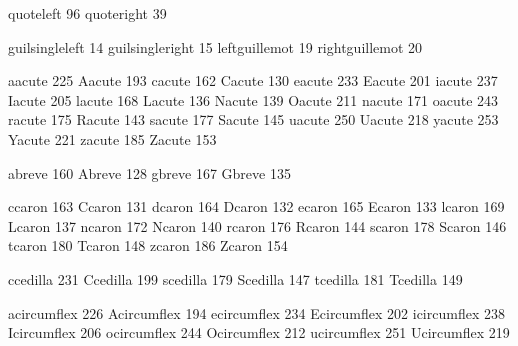  quoteleft        96
 quoteright       39

 guilsingleleft   14
 guilsingleright  15
 leftguillemot    19
 rightguillemot   20

 aacute          225
 Aacute          193
 cacute          162
 Cacute          130
 eacute          233
 Eacute          201
 iacute          237
 Iacute          205
 lacute          168
 Lacute          136
 Nacute          139
 Oacute          211
 nacute          171
 oacute          243
 racute          175
 Racute          143
 sacute          177
 Sacute          145
 uacute          250
 Uacute          218
 yacute          253
 Yacute          221
 zacute          185
 Zacute          153

 abreve          160
 Abreve          128
 gbreve          167
 Gbreve          135

 ccaron          163
 Ccaron          131
 dcaron          164
 Dcaron          132
 ecaron          165
 Ecaron          133
 lcaron          169
 Lcaron          137
 ncaron          172
 Ncaron          140
 rcaron          176
 Rcaron          144
 scaron          178
 Scaron          146
 tcaron          180
 Tcaron          148
 zcaron          186
 Zcaron          154

 ccedilla        231
 Ccedilla        199
 scedilla        179
 Scedilla        147
 tcedilla        181
 Tcedilla        149

 acircumflex     226
 Acircumflex     194
 ecircumflex     234
 Ecircumflex     202
 icircumflex     238
 Icircumflex     206
 ocircumflex     244
 Ocircumflex     212
 ucircumflex     251
 Ucircumflex     219


